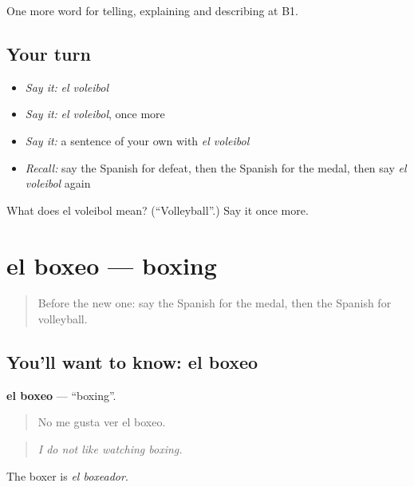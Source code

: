 \begin{grammarlens}[title={What you've built}]
One more word for telling, explaining and describing at B1.
\end{grammarlens}

\subsection*{Your turn}
\begin{itemize}
\raggedright
  \item \emph{Say it:} \emph{el voleibol}
  \item \emph{Say it:} \emph{el voleibol}, once more
  \item \emph{Say it:} a sentence of your own with \emph{el voleibol}
  \item \emph{Recall:} say the Spanish for defeat, then the Spanish for the medal, then say \emph{el voleibol} again
\end{itemize}

\begin{tcolorbox}[breakable,colback=teal!4,colframe=teal!35!black,title={Before you move on}]
What does el voleibol mean? (\textquotedblleft{}Volleyball\textquotedblright{}.) Say it once more.
\end{tcolorbox}
\section[el boxeo]{el boxeo — boxing}

\label{lesson:ES-C758-boxeo}



\begin{quote}
Before the new one: say the Spanish for the medal, then the Spanish for volleyball.
\end{quote}

\subsection*{You'll want to know: el boxeo}
\textbf{el boxeo} — \textquotedblleft{}boxing\textquotedblright{}.

\begin{quote}
No me gusta ver el boxeo.
\end{quote}

\begin{quote}
\emph{I do not like watching boxing.}
\end{quote}

The boxer is \emph{el boxeador}.

